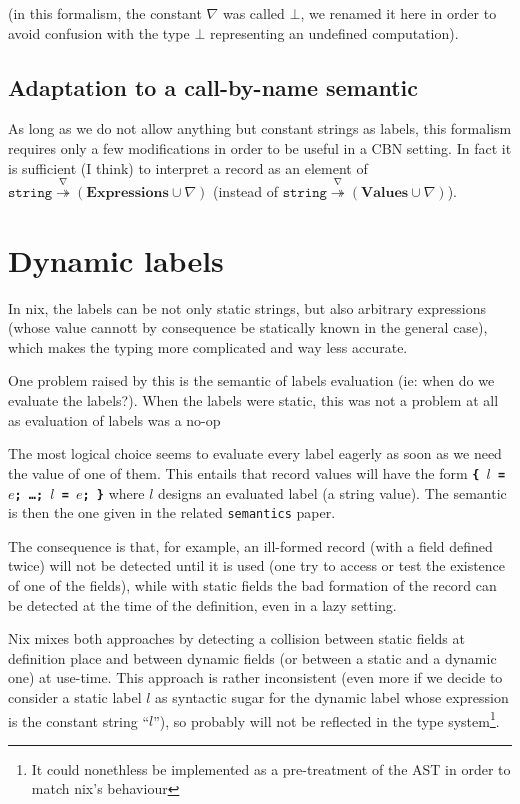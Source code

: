 \documentclass{article}
\renewcommand{\|}{\textrm{|}}
\newcommand{\ty}[1]{\texttt{#1}}
\newcommand{\undef}{\nabla}
\newcommand{\quasiconst}[1]{\overset{#1}{\twoheadrightarrow}}
\newcommand{\Γ}{\Gamma}
\newcommand{\τ}{\tau}
\newcommand{\σ}{\sigma}
\begin{document}
(in this formalism, the constant $\undef$ was called $\bot$, we renamed it here
in order to avoid confusion with the type $\bot$ representing an undefined
computation).

\subsection{Adaptation to a call-by-name semantic}

As long as we do not allow anything but constant strings as labels, this
formalism requires only a few modifications in order to be useful in a CBN
setting. In fact it is sufficient (I think) to interpret a record as an element
of $\ty{string} \quasiconst{\undef} \left(\textbf{Expressions} \cup
\undef\right)$ (instead of $\ty{string} \quasiconst{\undef}
\left(\textbf{Values} \cup \undef\right)$).

\section{Dynamic labels}

In nix, the labels can be not only static strings, but also arbitrary
expressions (whose value cannott by consequence be statically known in the
general case), which makes the typing more complicated and way less accurate.

One problem raised by this is the semantic of labels evaluation (ie: when do we
evaluate the labels?). When the labels were static, this was not a problem at
all as evaluation of labels was a no-op

The most logical choice seems to evaluate every label eagerly as soon as we
need the value of one of them. This entails that record values will have the
form \texttt{\bfseries \{ $l$ = $e$; \ldots{}; $l$ = $e$; \}} where $l$ designs
an evaluated label (a string value). The semantic is then the one given in the
related \texttt{semantics} paper.

The consequence is that, for example, an ill-formed record (with a field
defined twice) will not be detected until it is used (one try to access or test
the existence of one of the fields), while with static fields the bad formation
of the record can be detected at the time of the definition, even in a lazy
setting.

Nix mixes both approaches by detecting a collision between static fields at
definition place and between dynamic fields (or between a static and a dynamic
one) at use-time. This approach is rather inconsistent (even more if we decide
to consider a static label $l$ as syntactic sugar for the dynamic label whose
expression is the constant string ``$l$''), so probably will not be reflected in
the type system\footnote{It could nonethless be implemented as a pre-treatment
of the AST in order to match nix's behaviour}.
\end{document}

